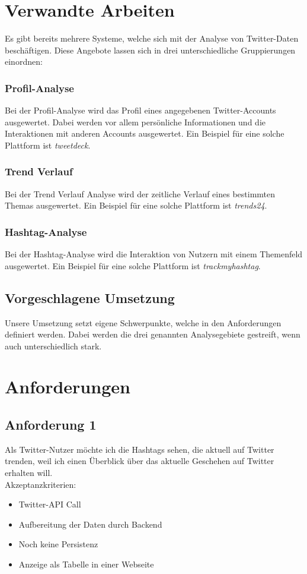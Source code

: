 \documentclass[conference]{IEEEtran}
\begin{document}
\section{Verwandte Arbeiten}
Es gibt bereits mehrere Systeme, welche sich mit der Analyse von Twitter-Daten beschäftigen.
Diese Angebote lassen sich in drei unterschiedliche Gruppierungen einordnen:
\subsubsection*{Profil-Analyse}
Bei der Profil-Analyse wird das Profil eines angegebenen Twitter-Accounts ausgewertet.
Dabei werden vor allem persönliche Informationen und die Interaktionen mit anderen Accounts ausgewertet.
Ein Beispiel für eine solche Plattform ist \textit{tweetdeck}\cite{tweetdeck}.
\subsubsection*{Trend Verlauf}
Bei der Trend Verlauf Analyse wird der zeitliche Verlauf eines bestimmten Themas ausgewertet. Ein Beispiel für eine solche Plattform ist \textit{trends24}\cite{trends24}.
\subsubsection*{Hashtag-Analyse}
Bei der Hashtag-Analyse wird die Interaktion von Nutzern mit einem Themenfeld ausgewertet.
Ein Beispiel für eine solche Plattform ist \textit{trackmyhashtag}\cite{trackmyhashtag}.
\subsection{Vorgeschlagene Umsetzung}
Unsere Umsetzung setzt eigene Schwerpunkte, welche in den Anforderungen definiert werden.
Dabei werden die drei genannten Analysegebiete gestreift, wenn auch unterschiedlich stark.
\section{Anforderungen}

\subsection*{Anforderung 1}
Als Twitter-Nutzer möchte ich die Hashtags sehen, die aktuell auf Twitter trenden,
weil ich einen Überblick über das aktuelle Geschehen auf Twitter erhalten will.
\\
Akzeptanzkriterien:
\begin{itemize}
        \item Twitter-API Call
        \item Aufbereitung der Daten durch Backend
        \item Noch keine Persistenz
        \item Anzeige als Tabelle in einer Webseite
\end{itemize}
\end{document}
